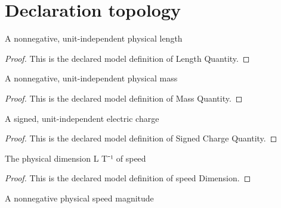 \section{Declaration topology}
\begin{definition}
  \label{def:physics:phyx-mini-0864:phyxminiproblems-problemphyxmini0864-lengthquantity}
  A nonnegative, unit-independent physical length
\end{definition}
\begin{proof}
  This is the declared model definition of Length Quantity.
\end{proof}
\begin{definition}
  \label{def:physics:phyx-mini-0864:phyxminiproblems-problemphyxmini0864-massquantity}
  A nonnegative, unit-independent physical mass
\end{definition}
\begin{proof}
  This is the declared model definition of Mass Quantity.
\end{proof}
\begin{definition}
  \label{def:physics:phyx-mini-0864:phyxminiproblems-problemphyxmini0864-signedchargequantity}
  A signed, unit-independent electric charge
\end{definition}
\begin{proof}
  This is the declared model definition of Signed Charge Quantity.
\end{proof}
\begin{definition}
  \label{def:physics:phyx-mini-0864:phyxminiproblems-problemphyxmini0864-speeddimension}
  The physical dimension L T⁻¹ of speed
\end{definition}
\begin{proof}
  This is the declared model definition of speed Dimension.
\end{proof}
\begin{definition}
  \label{def:physics:phyx-mini-0864:phyxminiproblems-problemphyxmini0864-speedmagnitudequantity}
  A nonnegative physical speed magnitude
\end{definition}
